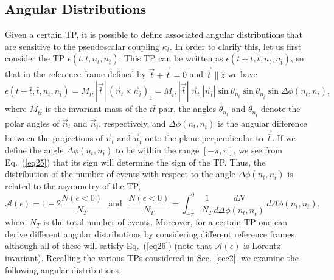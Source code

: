 \documentclass[aps,preprint,tightenlines,floatfix,superscriptaddress,nofootinbib,showpacs]{revtex4-1}
\def\beq{\begin{equation}}
\def\eeq{\end{equation}}
\def\tbar{\bar{t}}
\def\kpt{\tilde{\kappa}_t}
\begin{document}
\subsection{Angular Distributions}
\label{sec3.2}

Given a certain TP, it is possible to define associated angular
distributions that are sensitive to the pseudoscalar coupling
$\kpt$. In order to clarify this, let us first consider the TP
$\epsilon(t,\tbar,n_t,n_{\tbar})$. This TP can be written as
$\epsilon(t+\tbar,\tbar,n_t,n_{\tbar})$, so that in the reference frame
defined by $\vec{t}+\vec{\tbar} =0$ and $\vec{\tbar}\parallel \hat{z}$
we have
%
\beq
\label{eq25}
\epsilon(t+\tbar,\tbar,n_t,n_{\tbar})=M_{t\tbar}\,|\vec{\tbar}|\,(\vec{n}_t\times \vec{n}_{\tbar})_z=M_{t\tbar}\,|\vec{\tbar}||\vec{n}_t||\vec{n}_{\tbar}|\sin\theta_{n_t}\sin\theta_{n_{\tbar}}\sin \Delta \phi(n_t,n_{\tbar}),
\eeq
%
where $M_{t\tbar}$ is the invariant mass of the $t\tbar$ pair, the
angles $\theta_{n_t}$ and $\theta_{n_{\tbar}}$ denote the polar angles
of $\vec{n}_t$ and $\vec{n}_{\tbar}$, respectively, and 
$\Delta\phi(n_t,n_{\tbar})$ is the angular difference between the
projections of $\vec{n}_t$ and $\vec{n}_{\tbar}$ onto the plane
perpendicular to $\vec{\bar{t}}$. If we define the angle
$\Delta\phi(n_t,n_{\tbar})$  to be within the
range $[-\pi,\pi]$, we see from Eq.~(\ref{eq25}) that its sign will
determine the sign of the TP. Thus, the distribution of the
number of events with respect to the angle
$\Delta\phi(n_t,n_{\tbar})$ is related to the asymmetry of the TP,
%
\beq
\label{eq26}
\mathcal{A}(\epsilon)=1-2\frac{N(\epsilon < 0)}{N_T}\,\,\mbox{ and }\,\,\frac{N(\epsilon < 0)}{N_T}=\int^0_{-\pi}\frac{1}{N_T}\frac{dN}{d\Delta\phi(n_t,n_{\tbar})}\,d\Delta\phi(n_t,n_{\tbar}),
\eeq  
%
where $N_T$ is the total number of events.
Moreover, for a certain TP
one can derive different angular distributions by considering
different reference frames, although all of these will satisfy
Eq.~(\ref{eq26}) (note that $\mathcal{A}(\epsilon)$
is Lorentz invariant). Recalling the various TPs considered
in Sec.~\ref{sec2}, we examine the following angular distributions.
\end{document}
